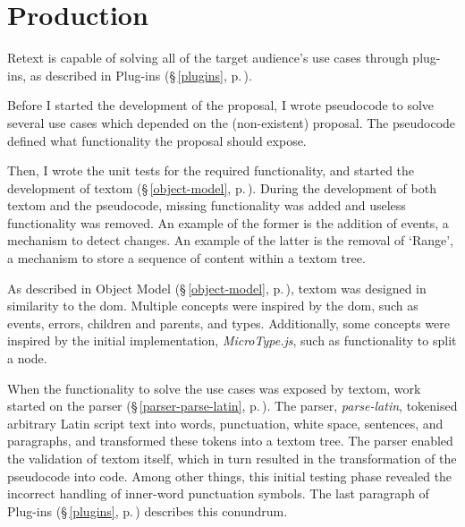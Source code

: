 
\begingroup
\let\clearpage\relax
\let\cleardoublepage\relax
\let\cleardoublepage\relax

\manualmark
{}

\chapter*{Production}\label{addendum-production}

Retext is capable of solving all of the target audience's use cases through
  plug-ins, as described in Plug-ins (§\,\ref{plugins},
  p.\,\pageref{plugins}).

Before I started the development of the proposal, I wrote pseudocode to
  solve several use cases which depended on the (non-existent) proposal.
The pseudocode defined what functionality the proposal should expose.

Then, I wrote the unit tests for the required functionality, and started
  the development of \gls{textom} (§\,\ref{object-model},
  p.\,\pageref{object-model}).
During the development of both \gls{textom} and the pseudocode, missing
  functionality was added and useless functionality was removed.
An example of the former is the addition of events, a mechanism to detect
  changes.
An example of the latter is the removal of `Range', a mechanism to store a
  sequence of content within a \gls{textom} tree.

As described in Object Model (§\,\ref{object-model},
  p.\,\pageref{object-model}), \gls{textom} was designed in similarity to the
  \gls{dom}.
Multiple concepts were inspired by the \gls{dom}, such as events, errors,
  children and parents, and types.
Additionally, some concepts were inspired by the initial implementation,
  \emph{MicroType.js}, such as functionality to split a node.

When the functionality to solve the use cases was exposed by \gls{textom},
  work started on the parser (§\,\ref{parser-parse-latin},
  p.\,\pageref{parser-parse-latin}).
The parser, \emph{parse-latin}, tokenised arbitrary Latin script text into
  words, punctuation, white space, sentences, and paragraphs, and transformed
  these tokens into a \gls{textom} tree.
The parser enabled the validation of \gls{textom} itself, which in turn
  resulted in the transformation of the pseudocode into code.
Among other things, this initial testing phase revealed the incorrect
  handling of inner-word punctuation symbols.
The last paragraph of Plug-ins (§\,\ref{plugins}, p.\,\pageref{plugins})
  describes this conundrum.

